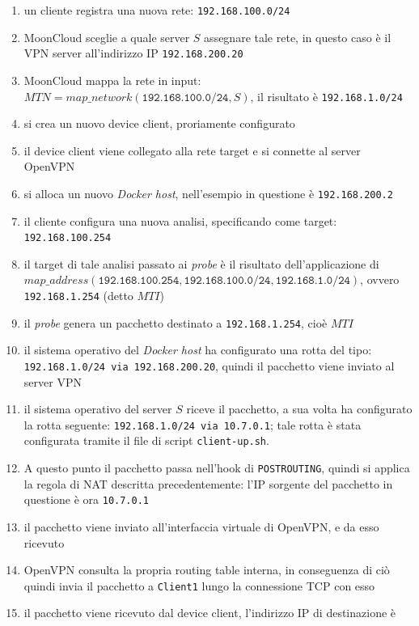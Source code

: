 \begin{enumerate}
  \item un cliente registra una nuova rete: \texttt{192.168.100.0/24}
  \item MoonCloud sceglie a quale server $S$ assegnare tale rete,
  in questo caso è il VPN server all'indirizzo IP \texttt{192.168.200.20}
  \item MoonCloud mappa la rete in input: $MTN=map\_network(\texttt{192.168.100.0/24}, S)$,
  il risultato è \texttt{192.168.1.0/24}
  \item si crea un nuovo device client, proriamente configurato
  \item il device client viene collegato alla rete target e si connette al server OpenVPN
  \item si alloca un nuovo \textit{Docker host}, nell'esempio in questione è \texttt{192.168.200.2}
  \item il cliente configura una nuova analisi, specificando come target: \texttt{192.168.100.254}
  \item il target di tale analisi passato ai \textit{probe} è il risultato dell'applicazione
  di $map\_address(\texttt{192.168.100.254}, \texttt{192.168.100.0/24}, \texttt{192.168.1.0/24})$,
  ovvero \texttt{192.168.1.254} (detto $MTI$)
  \item il \textit{probe} genera un pacchetto destinato a \texttt{192.168.1.254}, cioè $MTI$
  \item il sistema operativo del \textit{Docker host} ha configurato una rotta del tipo:
  \texttt{192.168.1.0/24 via 192.168.200.20}, quindi il pacchetto viene inviato al server VPN
  \item il sistema operativo del server $S$ riceve il pacchetto, a sua volta ha configurato
  la rotta seguente: \texttt{192.168.1.0/24 via 10.7.0.1}; tale rotta è stata configurata
  tramite il file di script \texttt{client-up.sh}.
  \item A questo punto il pacchetto passa nell'hook di \texttt{POSTROUTING}, quindi
  si applica la regola di NAT descritta precedentemente: l'IP sorgente del
  pacchetto in questione è ora \texttt{10.7.0.1}
  \item il pacchetto viene inviato all'interfaccia
  virtuale di OpenVPN, e da esso ricevuto
  \item OpenVPN consulta la propria routing table interna, in conseguenza di ciò quindi
  invia il pacchetto a \texttt{Client1} lungo la connessione TCP con esso
  \item il pacchetto viene ricevuto dal device client, l'indirizzo IP di destinazione è

\end{enumerate}
